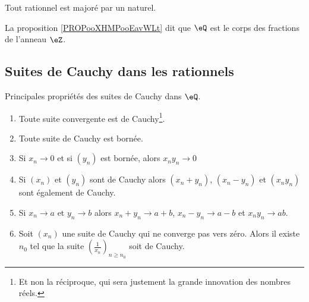 \begin{lemma} \label{LEMooEBTIooGMoHsj}
    Tout rationnel est majoré par un naturel.
\end{lemma}

La proposition \ref{PROPooXHMPooEavWLt} dit que \( \eQ\) est le corps des fractions de l'anneau \( \eZ\).

\subsection{Suites de Cauchy dans les rationnels}

\begin{proposition}        \label{PropFFDJooAapQlP}
    Principales propriétés des suites de Cauchy dans \( \eQ\).
    \begin{enumerate}
        \item       \label{ItemRKCIooJguHdji}
            Toute suite convergente est de Cauchy\footnote{Et non la réciproque, qui sera justement la grande innovation des nombres réels.}.
        \item       \label{ItemRKCIooJguHdjii}
            Toute suite de Cauchy est bornée.
        \item       \label{ItemRKCIooJguHdjiii}
            Si \( x_n\to 0\) et si \( (y_n)\) est bornée, alors \( x_ny_n\to 0\)
        \item
            Si \( (x_n)\) et \( (y_n)\) sont de Cauchy alors \( (x_n+y_n)\), \( (x_n-y_n)\) et \( (x_ny_n)\) sont également de Cauchy.
        \item       \label{ITEMooIAFSooAIUpAN}
            Si \( x_n\to a \) et \( y_n\to b \) alors \( x_n+y_n\to a+b\), \( x_n-y_n\to a-b\) et \(  x_ny_n\to ab  \).
        \item   \label{ItemRKCIooJguHdjvi}
            Soit \( (x_n)\) une suite de Cauchy qui ne converge pas vers zéro. Alors il existe \( n_0\) tel que la suite \( \left( \frac{1}{ x_n } \right)_{n\geq n_0}\) soit de Cauchy.
    \end{enumerate}
\end{proposition}


